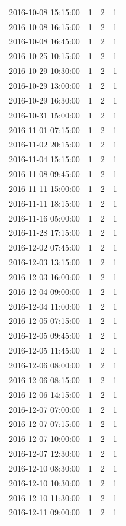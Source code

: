 \begin{tabular}{lrrr}
2016-10-08 15:15:00 & 1 & 2 & 1 \\
2016-10-08 16:15:00 & 1 & 2 & 1 \\
2016-10-08 16:45:00 & 1 & 2 & 1 \\
2016-10-25 10:15:00 & 1 & 2 & 1 \\
2016-10-29 10:30:00 & 1 & 2 & 1 \\
2016-10-29 13:00:00 & 1 & 2 & 1 \\
2016-10-29 16:30:00 & 1 & 2 & 1 \\
2016-10-31 15:00:00 & 1 & 2 & 1 \\
2016-11-01 07:15:00 & 1 & 2 & 1 \\
2016-11-02 20:15:00 & 1 & 2 & 1 \\
2016-11-04 15:15:00 & 1 & 2 & 1 \\
2016-11-08 09:45:00 & 1 & 2 & 1 \\
2016-11-11 15:00:00 & 1 & 2 & 1 \\
2016-11-11 18:15:00 & 1 & 2 & 1 \\
2016-11-16 05:00:00 & 1 & 2 & 1 \\
2016-11-28 17:15:00 & 1 & 2 & 1 \\
2016-12-02 07:45:00 & 1 & 2 & 1 \\
2016-12-03 13:15:00 & 1 & 2 & 1 \\
2016-12-03 16:00:00 & 1 & 2 & 1 \\
2016-12-04 09:00:00 & 1 & 2 & 1 \\
2016-12-04 11:00:00 & 1 & 2 & 1 \\
2016-12-05 07:15:00 & 1 & 2 & 1 \\
2016-12-05 09:45:00 & 1 & 2 & 1 \\
2016-12-05 11:45:00 & 1 & 2 & 1 \\
2016-12-06 08:00:00 & 1 & 2 & 1 \\
2016-12-06 08:15:00 & 1 & 2 & 1 \\
2016-12-06 14:15:00 & 1 & 2 & 1 \\
2016-12-07 07:00:00 & 1 & 2 & 1 \\
2016-12-07 07:15:00 & 1 & 2 & 1 \\
2016-12-07 10:00:00 & 1 & 2 & 1 \\
2016-12-07 12:30:00 & 1 & 2 & 1 \\
2016-12-10 08:30:00 & 1 & 2 & 1 \\
2016-12-10 10:30:00 & 1 & 2 & 1 \\
2016-12-10 11:30:00 & 1 & 2 & 1 \\
2016-12-11 09:00:00 & 1 & 2 & 1 \\

\end{tabular}
